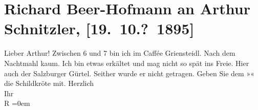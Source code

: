 

         
         \renewcommand{\erwaehntePersonen}{Personen: Richard Beer-Hofmann}
         \renewcommand{\erwaehnteOrte}{Orte: Café Griensteidl, Salzburg, Wien}
         \renewcommand{\erwaehnteWerke}{}
               \section[Richard Beer-Hofmann an Arthur Schnitzler, {[}19. 10.? 1895{]}]{ Richard Beer-Hofmann an Arthur Schnitzler, {[}19. 10.? 1895{]}}\nopagebreak{}\rehead{ }\begin{ledgroupsized}[t]{13cm}\normalsize\beginnumbering{} \toendnotes[C]{\smallbreak\pagebreak[2]} 
\toendnotes[C]{\smallbreak}\pstart
           \noindent{}{\pb}Lieber Arthur! Zwischen 6 und 7 bin ich im
               Caffée Griensteidl. Nach dem Nachtmahl kaum. Ich
               bin etwas erkältet und mag nicht so spät ins Freie. Hier auch der {\pb}Salzburger Gürtel. Seither wurde er nicht
               getragen. Geben Sie dem »\label{K_L00509-1v}\label{K_L00509-1h}« die Schildkröte mit.\pend
           \pstart
           Herzlich{\\[\baselineskip]}Ihr{\\[\baselineskip]}\spacefill\mbox{R}\pend
           \leftskip=0em{}
         
         \endnumbering{}\end{ledgroupsized}  \newcommand{\dateiname}{L00509}\newcommand{\titel}{Richard Beer-Hofmann an Arthur Schnitzler, [19. 10.? 1895]}\newcommand{\editorInnen}{ Martin Anton Müller und Gerd-Hermann Susen}
      